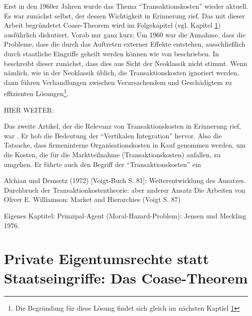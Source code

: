 Erst in den 1960er Jahren wurde das Thema "`Transaktionskosten"' wieder aktuell. Es war zunächst \textcite{Coase1960} selbst, der dessen Wichtigkeit in Erinnerung rief. Das mit dieser Arbeit begründetet Coase-Theorem wird im Folgekapitel (vgl. Kapitel \ref{Coase-Theorem}) ausführlich diskutiert. Vorab nur ganz kurz: Um 1960 war die Annahme, dass die Probleme, dass die durch das Auftreten externer Effekte entstehen, ausschließlich durch staatliche Eingriffe geheilt werden können wie von \textcite{Pigou1920} beschrieben. In \textcite{Coase1960} beschreibt dieser zunächst, dass dies aus Sicht der Neoklassik nicht stimmt. Wenn nämlich, wie in der Neoklassik üblich, die Transaktionskosten ignoriert werden, dann führen Verhandlungen zwischen Verursachendem und Geschädigtem zu effizienten Lösungen\footnote{Die Begründung für diese Lösung findet sich gleich im nächsten Kaptiel \ref{Coase-Theorem}}. 

HIER WEITER:

Das zweite Artikel, der die Relevanz von Transaktionskosten in Erinnerung rief, war \textcite{Arrow1969}. Er hob die Bedeutung der "`Vertikalen Integration"' hervor. Also die Tatsache, dass firmeninterne Organisationskosten in Kauf genommen werden, um die Kosten, die für die Marktteilnahme (Transaktionskosten) anfallen, zu umgehen. Er führte auch den Begriff der "`Transaktionskosten"' ein \parencite[S. 39]{Erlei2016}




Alchian und Demsetz (1972) [Voigt-Buch S. 81]: Weiterentwicklung des Ansatzes.
Durchbruch der Transaktionkostentheorie: aber anderer Ansatz Die Arbeiten von Oliver E. Williamson: Market and Hierarchies (Voigt S. 87)

Eigenes Kaptitel:
Prinzipal-Agent (Moral-Hazard-Problem): Jensen und Meckling 1976.




\section{Private Eigentumsrechte statt Staatseingriffe: Das Coase-Theorem}
\label{Coase-Theorem}

